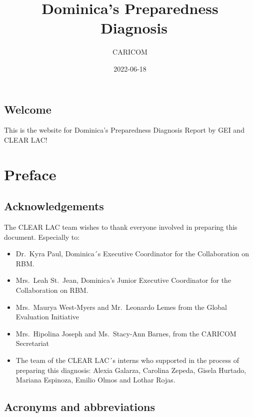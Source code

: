 \documentclass[
  10pt,
]{book}
\title{Dominica's Preparedness ~Diagnosis}
\author{CARICOM}
\date{2022-06-18}
\begin{document}
\maketitle

{
\setcounter{tocdepth}{1}
\tableofcontents
}
\hypertarget{welcome}{%
\chapter*{Welcome}\label{welcome}}

This is the website for Dominica's Preparedness Diagnosis Report by GEI and CLEAR LAC!

\hypertarget{part-preface}{%
\part{Preface}\label{part-preface}}

\hypertarget{acknowledgements}{%
\chapter*{Acknowledgements}\label{acknowledgements}}

The CLEAR LAC team wishes to thank everyone involved in preparing this document. Especially to:

\begin{itemize}
\item
  Dr.~Kyra Paul, Dominica´s Executive Coordinator for the Collaboration on RBM.
\item
  Mrs.~Leah St.~Jean, Dominica's Junior Executive Coordinator for the Collaboration on RBM.
\item
  Mrs.~Maurya West-Myers and Mr.~Leonardo Lemes from the Global Evaluation Initiative
\item
  Mrs.~Hipolina Joseph and Ms.~Stacy-Ann Barnes, from the CARICOM Secretariat
\item
  The team of the CLEAR LAC´s interns who supported in the process of preparing this diagnosis: Alexia Galarza, Carolina Zepeda, Gisela Hurtado, Mariana Espinoza, Emilio Olmos and Lothar Rojas.
\end{itemize}

\hypertarget{acronyms-and-abbreviations}{%
\chapter*{Acronyms and abbreviations}\label{acronyms-and-abbreviations}}
\end{document}

